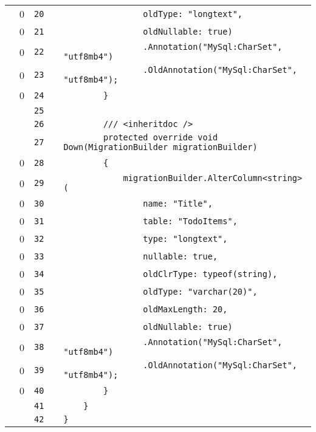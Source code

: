 \documentclass[a4paper,landscape,10pt]{article}
\begin{document}
\begin{longtable}[l]{lrrll}
\cellcolor{red} & 0 & \verb~20~ & & \verb~                oldType: "longtext",~\\
\cellcolor{red} & 0 & \verb~21~ & & \verb~                oldNullable: true)~\\
\cellcolor{red} & 0 & \verb~22~ & & \verb~                .Annotation("MySql:CharSet", "utf8mb4")~\\
\cellcolor{red} & 0 & \verb~23~ & & \verb~                .OldAnnotation("MySql:CharSet", "utf8mb4");~\\
\cellcolor{red} & 0 & \verb~24~ & & \verb~        }~\\
\cellcolor{gray} &  & \verb~25~ & & \verb~~\\
\cellcolor{gray} &  & \verb~26~ & & \verb~        /// <inheritdoc />~\\
\cellcolor{gray} &  & \verb~27~ & & \verb~        protected override void Down(MigrationBuilder migrationBuilder)~\\
\cellcolor{red} & 0 & \verb~28~ & & \verb~        {~\\
\cellcolor{red} & 0 & \verb~29~ & & \verb~            migrationBuilder.AlterColumn<string>(~\\
\cellcolor{red} & 0 & \verb~30~ & & \verb~                name: "Title",~\\
\cellcolor{red} & 0 & \verb~31~ & & \verb~                table: "TodoItems",~\\
\cellcolor{red} & 0 & \verb~32~ & & \verb~                type: "longtext",~\\
\cellcolor{red} & 0 & \verb~33~ & & \verb~                nullable: true,~\\
\cellcolor{red} & 0 & \verb~34~ & & \verb~                oldClrType: typeof(string),~\\
\cellcolor{red} & 0 & \verb~35~ & & \verb~                oldType: "varchar(20)",~\\
\cellcolor{red} & 0 & \verb~36~ & & \verb~                oldMaxLength: 20,~\\
\cellcolor{red} & 0 & \verb~37~ & & \verb~                oldNullable: true)~\\
\cellcolor{red} & 0 & \verb~38~ & & \verb~                .Annotation("MySql:CharSet", "utf8mb4")~\\
\cellcolor{red} & 0 & \verb~39~ & & \verb~                .OldAnnotation("MySql:CharSet", "utf8mb4");~\\
\cellcolor{red} & 0 & \verb~40~ & & \verb~        }~\\
\cellcolor{gray} &  & \verb~41~ & & \verb~    }~\\
\cellcolor{gray} &  & \verb~42~ & & \verb~}~\\
\end{longtable}
\end{document}
